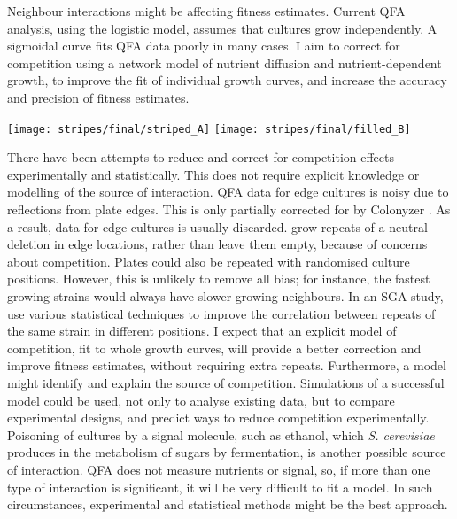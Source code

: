 Neighbour interactions might be affecting fitness estimates. Current
QFA analysis, using the logistic model, assumes that cultures grow
independently. A sigmoidal curve fits QFA data poorly in many cases.
I aim to correct for competition using a network model of nutrient
diffusion and nutrient-dependent growth, to improve the fit of
individual growth curves, and increase the accuracy and precision of
fitness estimates.
\begin{Figure}
  \centering
  \texttt{[image: stripes/final/striped\_A]}
  \texttt{[image: stripes/final/filled\_B]}
  \label{fig:stripes_images}
\end{Figure}
%
There have been attempts to reduce and correct for competition effects
experimentally and statistically. This does not require explicit
knowledge or modelling of the source of interaction. QFA data for edge
cultures is noisy due to reflections from plate edges. This is only
partially corrected for by Colonyzer \citep{Lawless2010}. As a result,
data for edge cultures is usually discarded. \citet{Addinall2011} grow
repeats of a neutral deletion in edge locations, rather than leave
them empty, because of concerns about competition. Plates could also
be repeated with randomised culture positions. However, this is
unlikely to remove all bias; for instance, the fastest growing strains
would always have slower growing neighbours. In an SGA study,
\citet{Baryshnikova2010} use various statistical techniques to improve
the correlation between repeats of the same strain in different
positions. I expect that an explicit model of competition, fit to
whole growth curves, will provide a better correction and improve
fitness estimates, without requiring extra repeats. Furthermore, a
model might identify and explain the source of
competition. Simulations of a successful model could be used, not only
to analyse existing data, but to compare experimental designs, and
predict ways to reduce competition experimentally. Poisoning of
cultures by a signal molecule, such as ethanol, which
\textit{S. cerevisiae} produces in the metabolism of sugars by
fermentation, is another possible source of interaction.
QFA does not measure nutrients or signal, so, if more than one type of
interaction is significant, it will be very difficult to fit a
model. In such circumstances, experimental and statistical methods
might be the best approach.

